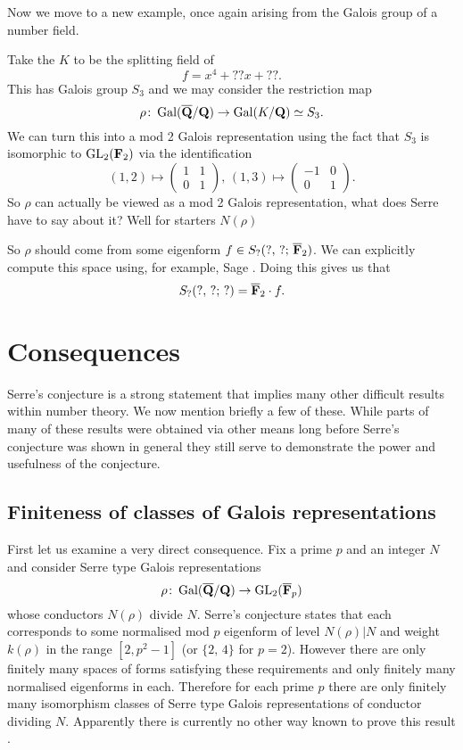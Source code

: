 \documentclass[a4paper,12pt]{article}
\begin{document}
Now we move to a new example, once again arising from the Galois group of a number field.

\begin{ex}
Take the $K$ to be the splitting field of
\[
f = x^4 + ??x + ??.
\]
This has Galois group $S_3$ and we may consider the restriction map
\[
\rho\colon \operatorname{Gal}(\overline{\mathbf{Q}}/\mathbf{Q}) \to \operatorname{Gal}(K/\mathbf{Q}) \simeq S_3.
\]
We can turn this into a mod 2 Galois representation using the fact that $S_3$ is isomorphic to $\operatorname{GL}_2(\mathbf{F}_2)$ via the identification %
\[
(1, 2) \mapsto \begin{pmatrix} 1 & 1 \\ 0 & 1 \end{pmatrix},\,
(1, 3) \mapsto \begin{pmatrix} -1 & 0 \\ 0 & 1 \end{pmatrix}.
\]
So $\rho$ can actually be viewed as a mod 2 Galois representation, what does Serre have to say about it?
Well for starters $N(\rho)$

So $\rho$ should come from some eigenform $f \in S_?(?,\,?;\,\overline{\mathbf{F}}_2)$.
We can explicitly compute this space using, for example, Sage \cite{Sage}.
Doing this gives us that
\[
S_?(?,\,?;\,?) = \overline{\mathbf{F}}_2 \cdot f.
\]

\end{ex}


\section{Consequences}
Serre's conjecture is a strong statement that implies many other difficult results within number theory.
We now mention briefly a few of these.
While parts of many of these results were obtained via other means long before Serre's conjecture was shown in general they still serve to demonstrate the power and usefulness of the conjecture.


\subsection{Finiteness of classes of Galois representations}
First let us examine a very direct consequence.
Fix a prime $p$ and an integer $N$ and consider Serre type Galois representations
\[
\rho\colon \operatorname{Gal}(\overline{\mathbf{Q}}/\mathbf{Q}) \to \operatorname{GL}_2(\overline{\mathbf{F}}_p)
\]
whose conductors $N(\rho)$ divide $N$.
Serre's conjecture states that each corresponds to some normalised mod $p$ eigenform of level $N(\rho)|N$ and weight $k(\rho)$ in the range $[2,p^2-1]$ (or $\{2,\,4\}$ for $p=2$).
However there are only finitely many spaces of forms satisfying these requirements and only finitely many normalised eigenforms in each.
Therefore for each prime $p$ there are only finitely many isomorphism classes of Serre type Galois representations of conductor dividing $N$.
Apparently there is currently no other way known to prove this result \cite{WieseMod}.
\end{document}
